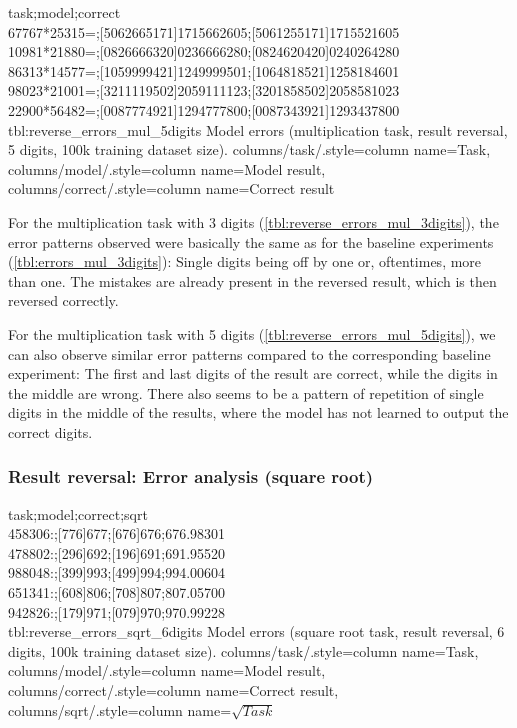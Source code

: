 {
task;model;correct\\
67767*25315=;[5062665171]1715662605;[5061255171]1715521605\\
10981*21880=;[0826666320]0236666280;[0824620420]0240264280\\
86313*14577=;[1059999421]1249999501;[1064818521]1258184601\\
98023*21001=;[3211119502]2059111123;[3201858502]2058581023\\
22900*56482=;[0087774921]1294777800;[0087343921]1293437800\\
}
{tbl:reverse_errors_mul_5digits}
{
    Model errors (multiplication task, result reversal, 5 digits, 100k training dataset size).
}
{
    columns/task/.style={column name={Task}},
    columns/model/.style={column name={Model result}},
    columns/correct/.style={column name={Correct result}}
}

For the multiplication task with 3 digits (\cref{tbl:reverse_errors_mul_3digits}), the error patterns observed were basically the same as for the baseline experiments  (\cref{tbl:errors_mul_3digits}): Single digits being off by one or, oftentimes, more than one.
The mistakes are already present in the reversed result,
which is then reversed correctly.

For the multiplication task with 5 digits (\cref{tbl:reverse_errors_mul_5digits}), we can also observe similar error patterns compared to the corresponding baseline experiment: The first and last digits of the result are correct, while the digits in the middle are wrong.
There also seems to be a pattern of repetition of single digits in the middle of the results, where the model has not learned to output the correct digits.

\subsubsection{Result reversal: Error analysis (square root)}

{
task;model;correct;sqrt\\
458306:;[776]677;[676]676;676.98301\\
478802:;[296]692;[196]691;691.95520\\
988048:;[399]993;[499]994;994.00604\\
651341:;[608]806;[708]807;807.05700\\
942826:;[179]971;[079]970;970.99228\\
}
{tbl:reverse_errors_sqrt_6digits}
{
    Model errors (square root task, result reversal, 6 digits, 100k training dataset size).
}
{
    columns/task/.style={column name={Task}},
    columns/model/.style={column name={Model result}},
    columns/correct/.style={column name={Correct result}},
    columns/sqrt/.style={column name={$\sqrt{Task}$}}
}

